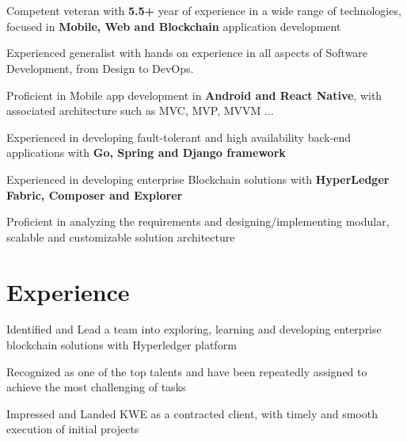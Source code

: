 \documentclass[]{resume}
\begin{document}


\section{}
\raggedright
{}
\begin{tightemize}
	\item Competent veteran with \textbf{5.5+} year of experience in a wide range of technologies, focused in \textbf{Mobile, Web and Blockchain} application development
	\item Experienced generalist with hands on experience in all aspects of Software Development, from Design to DevOps. 
	\item Proficient in Mobile app development in \textbf{Android and React Native}, with associated architecture such as MVC, MVP, MVVM ...
	\item Experienced in developing fault-tolerant and high availability back-end applications with \textbf{Go, Spring and Django framework}
	\item Experienced in developing enterprise Blockchain solutions with \textbf{HyperLedger Fabric, Composer and Explorer}
	\item Proficient in analyzing the requirements and designing/implementing modular, scalable and customizable solution architecture
\end{tightemize}
\sectionsep


\section{Experience}
\hfill {}
\begin{tightemize}
	\item Identified and Lead a team into exploring, learning and developing enterprise blockchain solutions with Hyperledger platform
    \item Recognized as one of the top talents and have been repeatedly assigned to achieve the most challenging of tasks 
	\item Impressed and Landed KWE as a contracted client, with timely and smooth execution of initial projects
\end{tightemize}
\sectionsep
\end{document}
